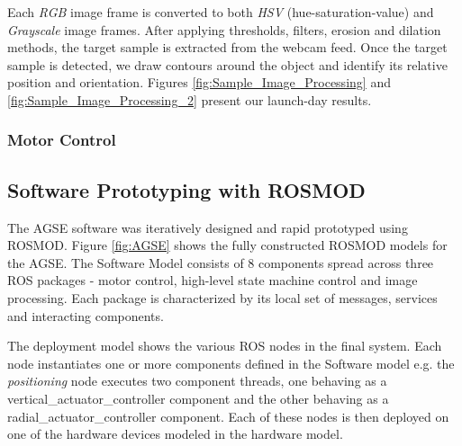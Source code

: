 Each \emph{RGB} image frame is converted to both \emph{HSV} (hue-saturation-value) and \emph{Grayscale} image frames. After applying thresholds, filters, erosion and dilation methods, the target sample is extracted from the webcam feed. Once the target sample is detected, we draw contours around the object and identify its relative position and orientation. Figures \ref{fig:Sample_Image_Processing} and \ref{fig:Sample_Image_Processing_2} present our launch-day results.

\subsubsection{Motor Control}





\subsection{Software Prototyping with ROSMOD}

The AGSE software \cite{AGSE} was iteratively designed and rapid prototyped using ROSMOD. Figure \ref{fig:AGSE} shows the fully constructed ROSMOD models for the AGSE. The Software Model consists of 8 components spread across three ROS packages - motor control, high-level state machine control and image processing. Each package is characterized by its local set of messages, services and interacting components. 

The deployment model shows the various ROS nodes in the final system. Each node instantiates one or more components defined in the Software model e.g. the \emph{positioning} node executes two component threads, one behaving as a vertical\_actuator\_controller component and the other behaving as a radial\_actuator\_controller component. Each of these nodes is then deployed on one of the hardware devices modeled in the hardware model.

